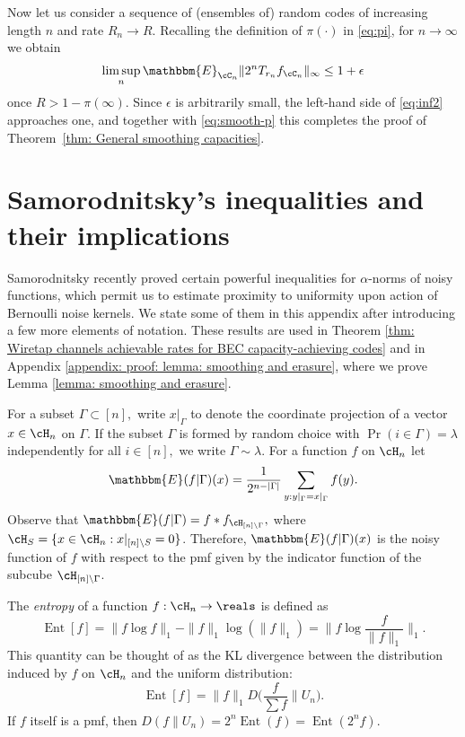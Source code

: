 \documentclass{amsart}
\theoremstyle{remark}
\DeclareMathOperator{\Ent}{Ent}
\begin{document}
Now let us consider a sequence of (ensembles of) random codes of increasing length $n$ and rate $R_n \to R$. Recalling the definition of $\pi(\cdot)$ in \eqref{eq:pi}, for $n\to\infty$ we obtain 
\begin{align}\label{eq:inf2}
    \limsup_n\mathbbm{E}_{\cC_n} \|2^nT_{r_n}f_{\cC_n}\|_\infty \leq 1+\epsilon
\end{align}
once $R > 1-\pi(\infty).$ Since $\epsilon$ is arbitrarily small, the left-hand side of \eqref{eq:inf2} approaches one, and together with \eqref{eq:smooth-p} this completes the proof of Theorem~\ref{thm: General smoothing capacities}. 


\section{Samorodnitsky's inequalities and their implications}\label{Appendix: 
 Sam}
Samorodnitsky \cite{samorodnitsky2016entropy,samorodnitsky2020improved} recently proved certain 
powerful inequalities for $\alpha$-norms of noisy functions, which permit us to estimate proximity to uniformity upon action of Bernoulli noise kernels. 
We state some of them in this appendix after introducing a few more elements of notation. These results are used in Theorem \ref{thm: Wiretap channels achievable rates for BEC capacity-achieving codes} and in Appendix \ref{appendix: proof: lemma: smoothing and erasure}, where we prove Lemma \ref{lemma: smoothing and erasure}. 


For a subset $\Gamma\subset [n],$ write $x|_\Gamma$ to denote the coordinate projection of a vector $x\in\cH_n$ on $\Gamma.$ If the subset $\Gamma$ is formed by random choice with $\Pr(i\in\Gamma)=\lambda$ independently for all $i\in[n],$ we write $\Gamma\sim\lambda$. For a function $f$ on 
$\cH_n$ let 
 \begin{equation} \label{eq:E}
   \mathbbm{E}(f|\Gamma)(x) = \frac{1}{2^{n-|\Gamma|}}\sum_{y:y|_\Gamma=x|_\Gamma}f(y).
\end{equation}
Observe that $\mathbbm{E}(f|\Gamma) = f  \ast f_{\cH_{[n]\setminus \Gamma}}, $ where $\cH_S = \{x \in \cH_n: x|_{[n]\setminus S} = 0\}$. Therefore, $\mathbbm{E}(f|\Gamma)(x)$ is the noisy function of $f$ with respect to the pmf given by the indicator function of the subcube $\cH_{[n]\setminus \Gamma}$.  

The {\em entropy} of a function $f:\cH_n\to\reals$ is defined as 
   \begin{equation}\label{eq:Ent-d}
   \Ent[f] = \|f\log f\|_1 - \|f\|_1 \log(\|f\|_1) = \big\|f\log\frac{f}{\|f\|_1}\big\|_1.
   \end{equation}
This quantity can be thought of as the KL divergence between the distribution induced by $f$ on $\cH_n$ and the uniform distribution:
  \begin{equation}\label{eq:E-D}
   \Ent[f] = \|f\|_1D\Big(\frac{f}{\sum f}\|U_n\Big).
  \end{equation}
If $f$ itself is a pmf, then $D(f\|U_n) = 2^n\Ent(f) = \Ent(2^nf).$ 
\end{document}
